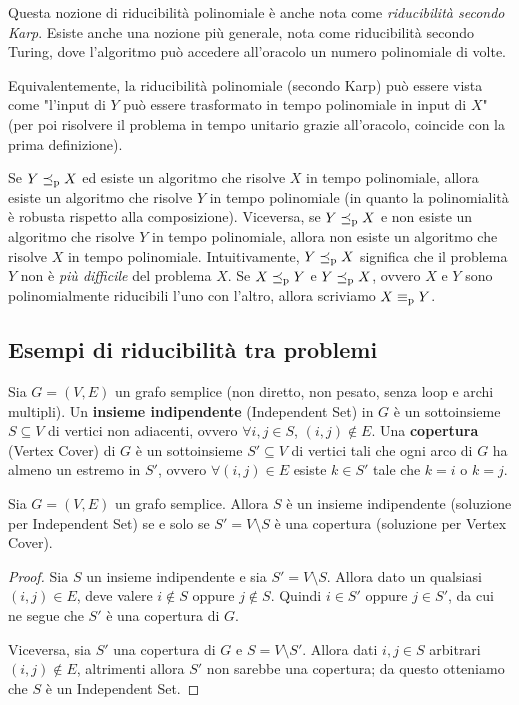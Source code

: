 Questa nozione di riducibilità polinomiale è anche nota come \textit{riducibilità secondo Karp}. Esiste anche una nozione più generale, nota come riducibilità secondo Turing, dove l'algoritmo può accedere all'oracolo un numero polinomiale di volte.

Equivalentemente, la riducibilità polinomiale (secondo Karp) può essere vista come "l'input di $Y$ può essere trasformato in tempo polinomiale in input di $X$" (per poi risolvere il problema in tempo unitario grazie all'oracolo, coincide con la prima definizione).

Se $Y \preceq_\text{p} X$ ed esiste un algoritmo che risolve $X$ in tempo polinomiale, allora esiste un algoritmo che risolve $Y$ in tempo polinomiale (in quanto la polinomialità è robusta rispetto alla composizione). Viceversa, se $Y \preceq_\text{p} X$ e non esiste un algoritmo che risolve $Y$ in tempo polinomiale, allora non esiste un algoritmo che risolve $X$ in tempo polinomiale. Intuitivamente, $Y \preceq_\text{p} X$ significa che il problema $Y$ non è \textit{più difficile} del problema $X$. Se $X \preceq_\text{p} Y$ e $Y \preceq_\text{p} X$, ovvero $X$ e $Y$ sono polinomialmente riducibili l'uno con l'altro, allora scriviamo $X \equiv_\text{p} Y$.

\subsection{Esempi di riducibilità tra problemi}

Sia $G = (V,E)$ un grafo semplice (non diretto, non pesato, senza loop e archi multipli). Un \textbf{insieme indipendente} (Independent Set) in $G$ è un sottoinsieme $S \subseteq V$ di vertici non adiacenti, ovvero $\forall i,j \in S$, $(i,j) \notin E$. Una \textbf{copertura} (Vertex Cover) di $G$ è un sottoinsieme $S' \subseteq V$ di vertici tali che ogni arco di $G$ ha almeno un estremo in $S'$, ovvero $\forall (i,j) \in E$ esiste $k \in S'$ tale che $k = i$ o $k = j$. \\

\begin{fact}
    \label{f:isvc}
    Sia $G = (V,E)$ un grafo semplice. Allora $S$ è un insieme indipendente (soluzione per Independent Set) se e solo se $S' = V \setminus S$ è una copertura (soluzione per Vertex Cover).
\end{fact}
\begin{proof}
    Sia $S$ un insieme indipendente e sia $S' = V \setminus S$. Allora dato un qualsiasi $(i,j) \in E$, deve valere $i \notin S$ oppure $j \notin S$. Quindi $i \in S'$ oppure $j \in S'$, da cui ne segue che $S'$ è una copertura di $G$.

    Viceversa, sia $S'$ una copertura di $G$ e $S = V \setminus S'$. Allora dati $i,j \in S$ arbitrari $(i,j) \notin E$, altrimenti allora $S'$ non sarebbe una copertura; da questo otteniamo che $S$ è un Independent Set.
\end{proof}

